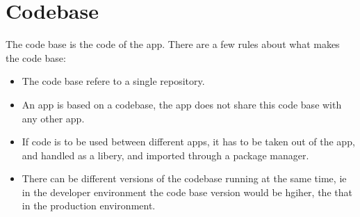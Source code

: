 \section*{Codebase}
The code base is the code of the app.
There are a few rules about what makes the code base:
\begin{itemize}
\item The code base refere to a single repository.
\item An app is based on a codebase, the app does not share this code base with any other app.
\item If code is to be used between different apps, it has to be taken out of the app, and handled as a libery, and imported through a package manager.
\item There can be different versions of the codebase running at the same time, ie in the developer environment the code base version would be hgiher, the that in the production environment.
\end{itemize}